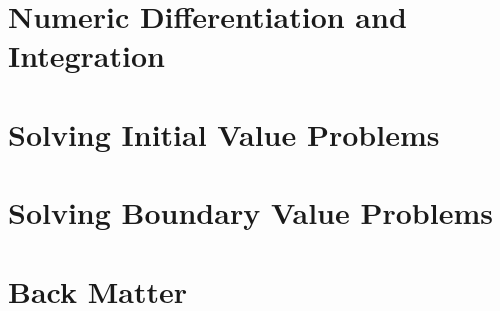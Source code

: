 \documentclass{tufte-book}
\theoremstyle{break}
\begin{document}
\part{Numeric Differentiation and Integration}









\part{Solving Initial Value Problems}







\part{Solving Boundary Value Problems}






\part{Back Matter}
\backmatter





\appendix
\appendixpage
\noappendicestocpagenum
\addappheadtotoc
\end{document}
